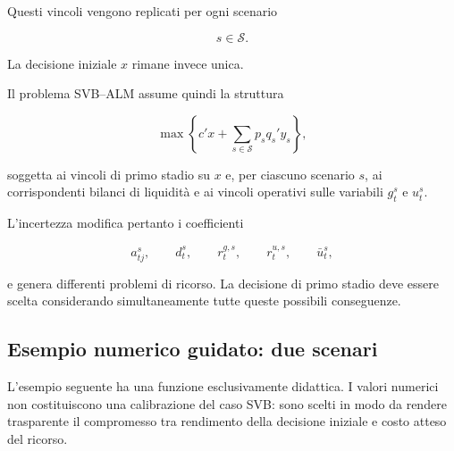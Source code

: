 Questi vincoli vengono replicati per ogni scenario

\[
s\in\mathcal S.
\]

La decisione iniziale $x$ rimane invece unica.

Il problema SVB--ALM assume quindi la struttura

\[
\max
\left\{
c'x+
\sum_{s\in\mathcal S}p_s q_s'y_s
\right\},
\]

\noindent soggetta ai vincoli di primo stadio su $x$ e, per ciascuno scenario $s$, ai
corrispondenti bilanci di liquidit\`a e ai vincoli operativi sulle variabili
$g_t^s$ e $u_t^s$.

L'incertezza modifica pertanto i coefficienti

\[
a_{tj}^s,
\qquad
d_t^s,
\qquad
r_t^{g,s},
\qquad
r_t^{u,s},
\qquad
\bar u_t^s,
\]

\noindent e genera differenti problemi di ricorso. La decisione di primo stadio deve
essere scelta considerando simultaneamente tutte queste possibili
conseguenze.

\subsection{Esempio numerico guidato: due scenari}

L'esempio seguente ha una funzione esclusivamente didattica. I valori
numerici non costituiscono una calibrazione del caso SVB: sono scelti in
modo da rendere trasparente il compromesso tra rendimento della decisione
iniziale e costo atteso del ricorso.

